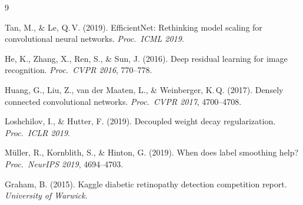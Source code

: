 \documentclass[a4paper, 10pt, twocolumn]{article}
\begin{document}
\vspace{10pt}

\renewcommand{\refname}{\normalfont\bfseries\small\color{accent}References}
\begin{thebibliography}{9}
\small\setlength{\itemsep}{1pt}

Tan, M., \& Le, Q.\,V. (2019).
EfficientNet: Rethinking model scaling for convolutional neural networks.
\textit{Proc.\ ICML 2019}.

He, K., Zhang, X., Ren, S., \& Sun, J. (2016).
Deep residual learning for image recognition.
\textit{Proc.\ CVPR 2016}, 770--778.

Huang, G., Liu, Z., van der Maaten, L., \& Weinberger, K.\,Q. (2017).
Densely connected convolutional networks.
\textit{Proc.\ CVPR 2017}, 4700--4708.

Loshchilov, I., \& Hutter, F. (2019).
Decoupled weight decay regularization.
\textit{Proc.\ ICLR 2019}.

Müller, R., Kornblith, S., \& Hinton, G. (2019).
When does label smoothing help?
\textit{Proc.\ NeurIPS 2019}, 4694--4703.

Graham, B. (2015).
Kaggle diabetic retinopathy detection competition report.
\textit{University of Warwick}.

\end{thebibliography}
\end{document}
